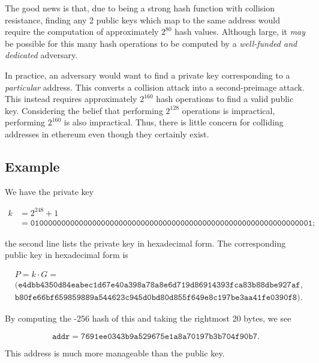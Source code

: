 The good news is that, due to \Keccak{} being a strong \gls{hash function}
with collision resistance,
finding any 2 public keys which map to the same address would require
the computation of approximately $2^{80}$ hash values.
Although large, it \emph{may} be possible for this many hash operations
to be computed by a \emph{well-funded and dedicated} adversary.

In practice, an adversary would want to find a private key
corresponding to a \emph{particular} address.
This converts a collision attack into a second-preimage attack.
This instead requires approximately $2^{160}$ hash operations
to find a valid public key.
Considering the belief that performing $2^{128}$ operations is impractical,
performing $2^{160}$ is also impractical.
Thus, there is little concern for colliding addresses in \gls{ethereum}
even though they certainly exist.

\subsection{Example}

\begin{example}

We have the private key

\begin{align}
    k &= 2^{248} + 1 \nonumber\\
&= \texttt{0100000000000000000000000000000000000000000000000000000000000001};
\end{align}

\noindent
the second line lists the private key in hexadecimal form.
The corresponding public key in hexadecimal form is

\begin{align}
    &P = k\cdot G = \nonumber\\
    &(\texttt{e4dbb4350d84eabec1d67e40a398a78a8e6d719d86914393fca83b88dbe927af},
        \nonumber\\
    &\texttt{b80fe66bf659859889a544623c945d0bd80d855f649e8c197be3aa41fe0390f8}).
\end{align}

\noindent
By computing the \Keccak{}-256 hash of this and taking the rightmost
20 bytes, we see

\begin{equation}
    \texttt{addr} = \texttt{7691ee0343b9a529675e1a8a70197b3b704f90b7}.
\end{equation}

\noindent
This address is much more manageable than the public key.
\end{example}



